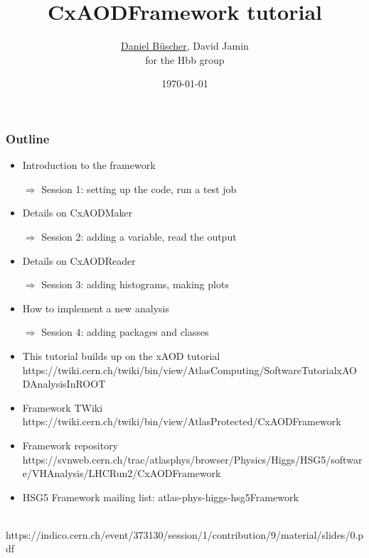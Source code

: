 \documentclass{beamer}
\begin{document}

\title{CxAODFramework tutorial}
\author[Daniel B\"uscher]{
\underline{Daniel B\"uscher},
David Jamin \\
for the Hbb group
}
\date{\today} 

\frame{\titlepage}

\scriptsize

\begin{frame}[fragile]
\frametitle{Outline}
\begin{itemize}
 \item Introduction to the framework
 \item[$\Rightarrow$] Session 1: setting up the code, run a test job
 \item Details on CxAODMaker
 \item[$\Rightarrow$] Session 2: adding a variable, read the output
 \item Details on CxAODReader
 \item[$\Rightarrow$] Session 3: adding histograms, making plots
 \item How to implement a new analysis
 \item[$\Rightarrow$] Session 4: adding packages and classes
\end{itemize}
\vspace{3mm}
\begin{itemize}
 \item This tutorial builds up on the xAOD tutorial\\
{\tiny https://twiki.cern.ch/twiki/bin/view/AtlasComputing/SoftwareTutorialxAODAnalysisInROOT }
 \item Framework TWiki\\
{\tiny https://twiki.cern.ch/twiki/bin/view/AtlasProtected/CxAODFramework}
 \item Framework repository
{\tiny https://svnweb.cern.ch/trac/atlasphys/browser/Physics/Higgs/HSG5/software/VHAnalysis/LHCRun2/CxAODFramework}
 \item HSG5 Framework mailing list: atlas-phys-higgs-hsg5Framework
\end{itemize}
\vspace{3mm}
\\
{\tiny https://indico.cern.ch/event/373130/session/1/contribution/9/material/slides/0.pdf}
\end{frame}
\end{document}
